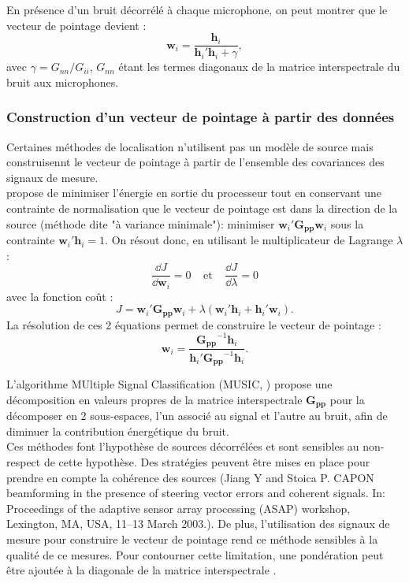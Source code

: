En présence d'un bruit décorrélé à chaque microphone, on peut montrer que le vecteur de pointage devient : 
\begin{equation}
	\bm{w}_i=\frac{\bm{h}_i}{\bm{h}_i'\bm{h}_i+\gamma},
\end{equation}
avec $\gamma=G_{nn}/G_{ii}$, $G_{nn}$ étant les termes diagonaux de la matrice interspectrale du bruit aux microphones.




\subsubsection{Construction d'un vecteur de pointage à partir des données}
Certaines méthodes de localisation n'utilisent pas un modèle de source mais construisennt le vecteur de pointage à partir de l'ensemble des covariances des signaux de mesure. \\
\cite{schmidt_1986} propose de minimiser l'énergie en sortie du processeur tout en conservant une contrainte de normalisation que le vecteur de pointage est dans la direction de la source (méthode dite "à variance minimale"): minimiser $\bm{w}_i'\bm{G_{pp}}\bm{w}_i$ sous la contrainte $\bm{w}_i'\bm{h}_i=1$.
On résout donc, en utilisant le multiplicateur de Lagrange $\lambda$ : 
\begin{equation}
\frac{\dd J}{\dd\bm{w}_i}=0~~~~~\text{et}~~~~~\frac{\dd J}{\dd\lambda}=0
\end{equation}
avec la fonction coût : 
\begin{equation}
J=\bm{w}_i'\bm{G_{pp}}\bm{w}_i + \lambda(\bm{w}_i'\bm{h}_i+\bm{h}_i'\bm{w}_i).
\end{equation}
La résolution de ces 2 équations permet de construire le vecteur de pointage : 
\begin{equation}
	\bm{w}_i=\frac{\bm{G_{pp}}^{-1}\bm{h}_{i}}{\bm{h}_i'\bm{G_{pp}}^{-1}\bm{h}_{i}}.
\end{equation}



L'algorithme MUltiple Signal Classification (MUSIC, \cite{schmidt_1986}) propose une décomposition en valeurs propres de la matrice interspectrale $\bm{G_{pp}}$ pour la décomposer en 2 sous-espaces, l’un associé au signal et l’autre au bruit, afin de diminuer la contribution énergétique du bruit.\\

Ces méthodes font l'hypothèse de sources décorrélées et sont sensibles au non-respect de cette hypothèse. Des stratégies peuvent être mises en place pour prendre en compte la cohérence des sources (Jiang Y and Stoica P. CAPON beamforming in the presence of steering vector errors and coherent signals. In: Proceedings of the adaptive sensor array processing (ASAP) workshop, Lexington, MA,
USA, 11–13 March 2003.). 
De plus, l'utilisation des signaux de mesure pour construire le vecteur de pointage rend ce méthode sensibles à la qualité de ce mesures. Pour contourner cette limitation, une pondération peut être ajoutée à la diagonale de la matrice interspectrale \citep{li_2003}.\\

